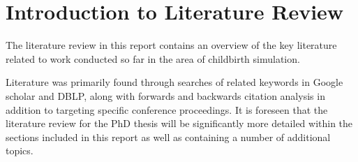 \section{Introduction to Literature Review}\label{lit-introduction}

The literature review in this report contains an overview of the key literature related to work conducted so far in the area of childbirth simulation.

Literature was primarily found through searches of related keywords in Google scholar and DBLP, along with forwards and backwards citation analysis in addition to targeting specific conference proceedings. It is foreseen that the literature review for the PhD thesis will be significantly more detailed within the sections included in this report as well as containing a number of additional topics.
